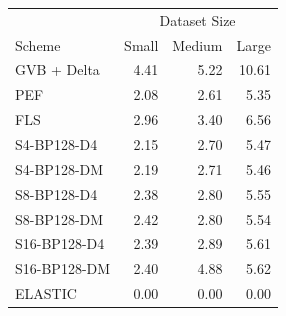 \begin{tabular}{lrrr}
\toprule
 & \multicolumn{3}{c}{Dataset Size} \\
Scheme & Small & Medium & Large \\
\midrule
GVB + Delta & 4.41 & 5.22 & 10.61 \\
PEF & 2.08 & 2.61 & 5.35 \\
FLS & 2.96 & 3.40 & 6.56 \\
S4-BP128-D4 & 2.15 & 2.70 & 5.47 \\
S4-BP128-DM & 2.19 & 2.71 & 5.46 \\
S8-BP128-D4 & 2.38 & 2.80 & 5.55 \\
S8-BP128-DM & 2.42 & 2.80 & 5.54 \\
S16-BP128-D4 & 2.39 & 2.89 & 5.61 \\
S16-BP128-DM & 2.40 & 4.88 & 5.62 \\
ELASTIC & 0.00 & 0.00 & 0.00 \\
\bottomrule
\end{tabular}
